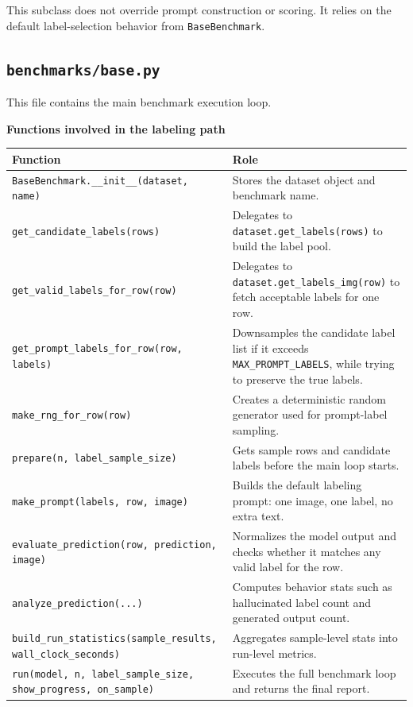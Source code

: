 \documentclass[11pt]{article}
\begin{document}
This subclass does not override prompt construction or scoring. It relies on the default label-selection behavior from \texttt{BaseBenchmark}.

\subsection*{\texttt{benchmarks/base.py}}
This file contains the main benchmark execution loop.

\textbf{Functions involved in the labeling path}
\begin{longtable}{>{\ttfamily}p{}p{}}
\textnormal{Function} & \textnormal{Role} \\
\hline
\texttt{BaseBenchmark.\_\_init\_\_(dataset, name)} & Stores the dataset object and benchmark name. \\
\texttt{get\_candidate\_labels(rows)} & Delegates to \texttt{dataset.get\_labels(rows)} to build the label pool. \\
\texttt{get\_valid\_labels\_for\_row(row)} & Delegates to \texttt{dataset.get\_labels\_img(row)} to fetch acceptable labels for one row. \\
\texttt{get\_prompt\_labels\_for\_row(row, labels)} & Downsamples the candidate label list if it exceeds \texttt{MAX\_PROMPT\_LABELS}, while trying to preserve the true labels. \\
\texttt{make\_rng\_for\_row(row)} & Creates a deterministic random generator used for prompt-label sampling. \\
\texttt{prepare(n, label\_sample\_size)} & Gets sample rows and candidate labels before the main loop starts. \\
\texttt{make\_prompt(labels, row, image)} & Builds the default labeling prompt: one image, one label, no extra text. \\
\texttt{evaluate\_prediction(row, prediction, image)} & Normalizes the model output and checks whether it matches any valid label for the row. \\
\texttt{analyze\_prediction(...)} & Computes behavior stats such as hallucinated label count and generated output count. \\
\texttt{build\_run\_statistics(sample\_results, wall\_clock\_seconds)} & Aggregates sample-level stats into run-level metrics. \\
\texttt{run(model, n, label\_sample\_size, show\_progress, on\_sample)} & Executes the full benchmark loop and returns the final report. \\
\end{longtable}
\end{document}
